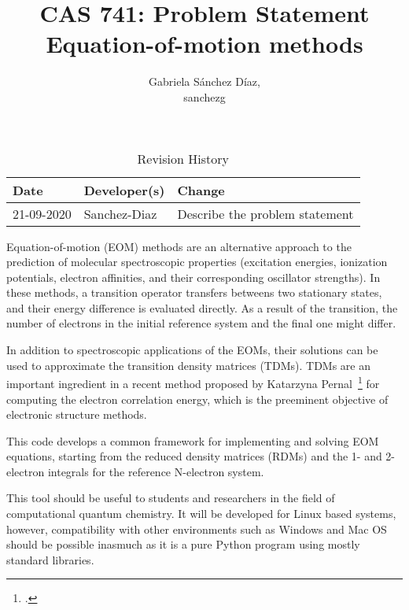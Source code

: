 \documentclass{article}
\title{CAS 741: Problem Statement\\Equation-of-motion methods}
\author{Gabriela S\'anchez D\'iaz,\\ sanchezg}
\date{}
\begin{document}
\maketitle

\begin{table}[hp]
\caption{Revision History} \label{TblRevisionHistory}
\begin{tabularx}{\textwidth}{llX}
\toprule
\textbf{Date} & \textbf{Developer(s)} & \textbf{Change}\\
\midrule
21-09-2020 & Sanchez-Diaz & Describe the problem statement\\
\bottomrule
\end{tabularx}
\end{table}

Equation-of-motion (EOM) methods are an alternative approach to the prediction of molecular spectroscopic properties (excitation energies, ionization potentials, electron affinities, and their corresponding oscillator strengths). In these methods, a transition operator transfers betweens two stationary states, and their energy difference is evaluated directly. As a result of the transition, the number of electrons in the initial reference system and the final one might differ.

In addition to spectroscopic applications of the EOMs, their solutions can be used to approximate the transition density matrices (TDMs). TDMs are an important ingredient in a recent method proposed by Katarzyna Pernal~\footcite{Pernal2018} for computing the electron correlation energy, which is the preeminent objective of electronic structure methods.  

This code develops a common framework for implementing and solving EOM equations, starting from the reduced density matrices (RDMs) and the 1- and 2-electron integrals for the reference N-electron system. 

This tool should be useful to students and researchers in the field of computational quantum chemistry. It will be developed for Linux based systems, however, compatibility with other environments such as Windows and Mac OS should be possible inasmuch as it is a pure Python program using mostly standard libraries.

\printbibliography

\end{document}
